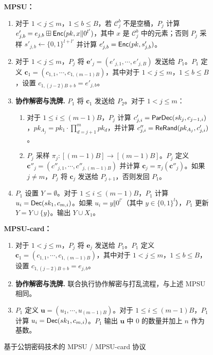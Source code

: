 \begin{figure}[!htb]
\begin{framed}
\begin{minipage}[c]{\textwidth}
\begin{trivlist}
    \item \textbf{MPSU：} 
    \begin{enumerate}[itemsep=2pt,topsep=0pt,parsep=0pt] \addtocounter{enumi}{3}
        \item 对于 $1 < j \le m$，$1 \le b \le B$，若 $\mathcal{C}_j^b$ 不是空桶，$P_j$ 计算 $e'_{j,b} = e_{j,b} \boxplus \mathsf{Enc}(pk,x \Vert 0^{l'})$，其中 $x$ 是 $\mathcal{C}_j^b$ 中的元素；否则 $P_j$ 采样 $s'_{j,b} \gets \{0,1\}^{l+l'}$ 并计算 $e'_{j,b} = \mathsf{Enc}(pk,s'_{j,b})$。
        \item 对于 $1 < j \le m$，$P_j$ 将 $\textbf{e}'_{j}=(e'_{j,1},\cdots,e'_{j,B})$ 发送给 $P_1$。$P_1$ 定义 $\textbf{c}_1 = (c_{1,1},\cdots,c_{1,(m-1)B})$，其中对于 $1 < j \le m$，$1 \le b \le B$，设置 ${c}_{1,(j-2)B+b} = e'_{j,b}$。
        \item \textbf{协作解密与洗牌.} $P_1$ 将 $\textbf{c}_1$ 发送给 $P_{2}$。对于 $1 < j \le m$： 
        \begin{enumerate}[itemsep=2pt,topsep=0pt,parsep=0pt]
        \item 对于 $1 \le i \le (m-1)B$，$P_j$ 计算 $c'_{j,i} = \mathsf{ParDec}(sk_j,c_{j-1,i})$，$pk_{A_j} = pk_1 \cdot \prod_{d = j+1}^m pk_d$，并计算 $c''_{j,i} = \mathsf{ReRand}(pk_{A_j},c'_{j,i})$。 
        \item $P_j$ 采样 $\pi_j:[(m-1)B] \to [(m-1)B]$。$P_j$ 定义 $\textbf{c}''_j = (c''_{j,1},\cdots,c''_{j,(m-1)B})$ 并计算 $\textbf{c}_{j} = {\pi_j}(\textbf{c}''_{j})$。如果 $j \ne m$，$P_j$ 将 $\textbf{c}_{j}$ 发送给 $P_{j+1}$，否则发回 $P_{1}$。
        \end{enumerate}
        \item $P_{1}$ 设置 $Y = \emptyset$。对于 $1 \le i \le (m-1)B$，$P_1$ 计算 $u_i = \mathsf{Dec}(sk_1,c_{m,i})$。如果 $u_i = y \Vert 0^{l'}$（其中 $y \in \{0,1\}^l$），$P_1$ 更新 $Y = Y \cup \{y\}$。输出 $Y \cup X_1$。
    \end{enumerate}
    \item \textbf{MPSU-card：} 
    \begin{enumerate}[itemsep=2pt,topsep=0pt,parsep=0pt] \addtocounter{enumi}{3}
        \item 对于 $1 < j \le m$，$P_j$ 将 $\textbf{e}_{j}$ 发送给 $P_1$。$P_1$ 定义 $\textbf{c}_1 = (c_{1,1},\cdots,c_{1,(m-1)B})$，其中对于 $1 < j \le m$，$1 \le b \le B$，设置 ${c}_{1,(j-2)B+b} = e_{j,b}$。
        \item \textbf{协作解密与洗牌.} 联合执行协作解密与打乱流程，与上述 MPSU 相同。
        \item $P_{1}$ 定义 $\textbf{u} = (u_1, \cdots, u_{(m-1)B})$。对于 $1 \le i \le (m-1)B$，$P_1$ 计算 $u_i = \mathsf{Dec}(sk_1,c_{m,i})$。$P_1$ 输出 $\textbf{u}$ 中 0 的数量并加上 $n$ 作为基数。
    \end{enumerate}
\end{trivlist}
\end{minipage}
\end{framed}
\caption{基于公钥密码技术的 MPSU / MPSU-card 协议}\label{fig:proto-MPSU}
\end{figure}

